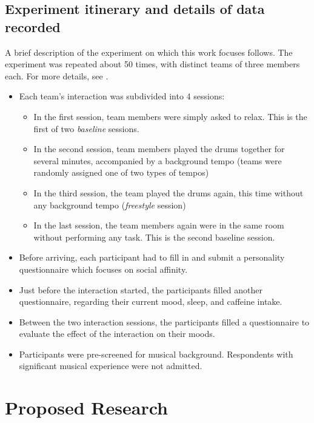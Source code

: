 \documentclass[a4paper, 11pt]{report}      %
\begin{document}
\subsection{Experiment itinerary and details of data recorded}
A brief description of the experiment on which this work focuses follows. The experiment was repeated about 50 times, with distinct teams of three members each. For more details, see \cite{gordon2020physio}.
\begin{itemize}
    \item Each team's interaction was subdivided into 4 sessions:
    \begin{itemize}
        \item In the first session, team members were simply asked to relax. This is the first of two \emph{baseline} sessions.
        \item In the second session, team members played the drums together for several minutes, accompanied by a background tempo (teams were randomly assigned one of two types of tempos)
        \item In the third session, the team played the drums again, this time without any background tempo (\emph{freestyle} session)
        \item In the last session, the team members again were in the same room without performing any task. This is the second baseline session.
    \end{itemize}
    \item Before arriving, each participant had to fill in and submit a personality questionnaire which focuses on social affinity.
    \item Just before the interaction started, the participants filled another questionnaire, regarding their current mood, sleep, and caffeine intake.
    \item Between the two interaction sessions, the participants filled a questionnaire to evaluate the effect of the interaction on their moods.
    \item Participants were pre-screened for musical  background. Respondents with significant musical experience were not admitted.
\end{itemize}



\section{Proposed Research}
\end{document}
